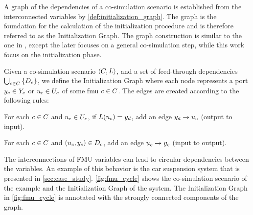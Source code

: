 

A graph of the dependencies of a co-simulation scenario is established from the interconnected variables by \cref{def:initialization_graph}. The graph is the foundation for the calculation of the initialization procedure and is therefore referred to as the Initialization Graph. The graph construction is similar to the one in \cite{Gomes2019c}, except the later focuses on a general co-simulation step, while this work focus on the initialization phase.

\begin{definition}\label{def:initialization_graph}
  Given a co-simulation scenario $ \left\langle C, L \right\rangle $, and a set of feed-through dependencies $\bigcup_{c \in C}  \left\{ D_{c} \right\}$, we define the Initialization Graph where each node represents a port $y_{c} \in Y_{c}$ or $u_{c} \in U_{c}$ of some fmu $c \in C$. The edges are created according to the following rules:
  \begin{compactenum}
    \item For each $c \in C$ and $u_{c} \in U_{c}$, if $L(u_{c}) = y_{d}$, add an edge $y_{d} -> u_{c}$ (output to input).
    \item For each $c \in C$ and $(u_{c},y_{c}) \in D_{c}$, add an edge $u_{c} -> y_{c}$ (input to output).
  \end{compactenum}
\end{definition}

The interconnections of FMU variables can lead to circular dependencies between the variables. An example of this behavior is the car suspension system that is presented in \cref{sec:case_study}. \cref{fig:fmu_cycle} shows the co-simulation scenario of the example and the Initialization Graph of the system. The Initialization Graph in \cref{fig:fmu_cycle} is annotated with the strongly connected components of the graph.

